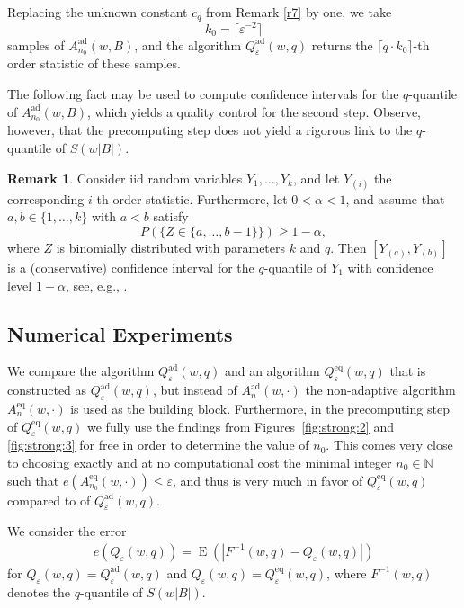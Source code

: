 \documentclass[a4paper]{amsart}
\theoremstyle{definition}
\newtheorem{rem}[exmp]{Remark}
\theoremstyle{plain}
\newcommand{\N}{\mathbb N}
\newcommand{\E}{\operatorname{E}}
\newcommand{\adap}{\ensuremath{ \mathrm{ad} }}
\newcommand{\equi}{\ensuremath{ \mathrm{eq} }}
\begin{document}
Replacing the unknown constant $c_q$ from Remark \ref{r7} by one, we take
\[
k_0=\lceil \varepsilon^{-2}\rceil
\]
samples of $A_{n_0}^\adap(w,B)$, and the algorithm
$Q^\adap_{\varepsilon}(w, q)$ returns the $\lceil q\cdot k_0\rceil$-th
order statistic of these samples.

The following fact may be used to compute confidence
intervals for the $q$-quantile of $A^\adap_{n_0} (w,B)$,
which yields a quality control for the second step.
Observe, however, that the precomputing step does not yield
a rigorous link to the $q$-quantile of $S(w|B|)$.

\begin{rem}\label{r8}
Consider iid random variables $Y_1, \dots, Y_k$, and let
$Y_{(i)}$ the corresponding $i$-th order statistic.
Furthermore, let $0 < \alpha < 1$, and assume that
$a, b \in \{1,\dots,k\}$ with $a < b$ satisfy
\[
P(\{Z\in \{a,\dots, b-1\}\}) \geq 1-\alpha,
\]
where $Z$ is binomially distributed with parameters $k$ and $q$.
Then $[Y_{(a)},Y_{(b)}]$ is a (conservative) confidence
interval for the $q$-quantile of $Y_1$ with confidence level
$1-\alpha$, see, e.g., \citet*[Sec.~7.1]{MR1994955}.
\end{rem}

\subsection{Numerical Experiments}\label{s5.2}

We compare the algorithm $Q^\adap_{\varepsilon}(w, q)$
and an algorithm $Q^\equi_{\varepsilon}(w, q)$ that is constructed as
$Q^\adap_{\varepsilon}(w, q)$, but instead of
$A_n^\adap (w,\cdot)$ the non-adaptive algorithm $A_n^\equi (w,\cdot)$
is used as the building block. Furthermore, in the precomputing
step of $Q^\equi_{\varepsilon}(w, q)$
we fully use the findings from Figures~\ref{fig:strong:2} and
\ref{fig:strong:3} for free in order to determine the value
of $n_0$. This comes very close to choosing exactly and
at no computational cost the minimal
integer $n_0 \in \N$ such that $e(A_{n_0}^\equi(w,\cdot)) \leq
\varepsilon$, and thus is very much in favor
of $Q^\equi_{\varepsilon}(w, q)$ compared to
of $Q^\adap_{\varepsilon}(w, q)$.

We consider the error
\begin{align}\label{eq:error-quant}
e(Q_\varepsilon(w,q))
=\E\left(\left|F^{-1}(w,q)-Q_\varepsilon(w,q)\right|\right)
\end{align}
for $Q_\varepsilon(w,q)=Q^\adap_{\varepsilon}(w, q)$ and
$Q_\varepsilon(w,q)=Q^\equi_{\varepsilon}(w, q)$,
where $F^{-1}(w,q)$ denotes the $q$-quantile of $S(w |B|)$.
\end{document}
